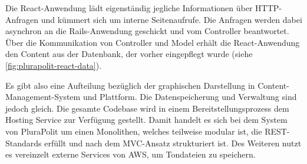 
Die React-Anwendung lädt eigenständig jegliche Informationen über HTTP-Anfragen und kümmert sich um interne Seitenaufrufe. Die Anfragen werden dabei asynchron an die Rails-Anwendung geschickt und vom Controller beantwortet. Über die Kommunikation von Controller und Model erhält die React-Anwendung den Content aus der Datenbank, der vorher eingepflegt wurde (siehe \cref{fig:plurapolit-react-data}).

Es gibt also eine Aufteilung bezüglich der graphischen Darstellung in Content-Management-System und Plattform. Die Datenspeicherung und Verwaltung sind jedoch gleich. Die gesamte Codebase wird in einem Bereitstellungsprozess dem Hosting Service zur Verfügung gestellt. Damit handelt es sich bei dem System von PluraPolit um einen Monolithen, welches teilweise modular ist, die REST-Standards erfüllt und nach dem MVC-Ansatz strukturiert ist. Des Weiteren nutzt es vereinzelt externe Services von AWS, um Tondateien zu speichern.
